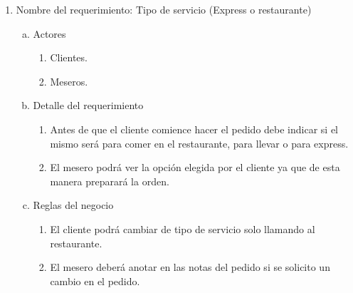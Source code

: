 \documentclass[conference]{IEEEtran}
\begin{document}
\begin{enumerate}
\item Nombre del requerimiento: Tipo de servicio (Express o restaurante)
\begin{enumerate}[a)]
\item Actores
	\begin{enumerate}[a]
	\item Clientes.
	\item Meseros.
	\end{enumerate}
\item Detalle del requerimiento
	\begin{enumerate}[P{a}so 1.]
	\item Antes de que el cliente comience hacer el pedido debe indicar si el mismo será para comer en el restaurante, para llevar o para express.
	\item El mesero podrá ver la opción elegida por el cliente ya que de esta manera preparará la orden.
	\end{enumerate}
\item Reglas del negocio
	\begin{enumerate}[a]
	\item El cliente podrá cambiar de tipo de servicio solo llamando al restaurante.
	\item El mesero deberá anotar en las notas del pedido si se solicito un cambio en el pedido.
	\end{enumerate}
\end{enumerate}


\end{enumerate}
\end{document}
